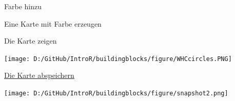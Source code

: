\documentclass[ignorenonframetext,]{beamer}
\newenvironment{Shaded}{\begin{snugshade}}{\end{snugshade}}
\newcommand{\DataTypeTok}[1]{\textcolor[rgb]{0.74,0.68,0.62}{\underline{#1}}}
\newcommand{\KeywordTok}[1]{\textcolor[rgb]{0.26,0.66,0.93}{\textbf{#1}}}
\newcommand{\NormalTok}[1]{\textcolor[rgb]{0.74,0.68,0.62}{#1}}
\newcommand{\OperatorTok}[1]{\textcolor[rgb]{0.74,0.68,0.62}{#1}}
\newcommand{\StringTok}[1]{\textcolor[rgb]{0.02,0.61,0.04}{#1}}
\begin{document}
\begin{frame}[fragile]{Farbe hinzu}
\protect\hypertarget{farbe-hinzu}{}

\begin{Shaded}
\end{Shaded}

\end{frame}

\begin{frame}[fragile]{Eine Karte mit Farbe erzeugen}
\protect\hypertarget{eine-karte-mit-farbe-erzeugen}{}

\begin{Shaded}
\end{Shaded}

\end{frame}

\begin{frame}{Die Karte zeigen}
\protect\hypertarget{die-karte-zeigen-1}{}

\texttt{[image: D:/GitHub/IntroR/buildingblocks/figure/WHCcircles.PNG]}

\end{frame}

\begin{frame}{\href{http://www.r-bloggers.com/interactive-mapping-with-leaflet-in-r-2/}{Die
Karte abspeichern}}
\protect\hypertarget{die-karte-abspeichern}{}

\texttt{[image: D:/GitHub/IntroR/buildingblocks/figure/snapshot2.png]}

\end{frame}
\end{document}
